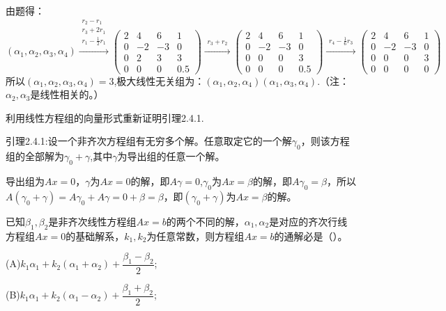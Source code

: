 \documentclass[a4paper]{report}
\begin{document}
\begin{jie}
由题得：
\begin{equation*}
(\alpha_1,\alpha_2,\alpha_3,\alpha_4)
\xrightarrow{\substack{r_{2}-r_{1}\\ r_3+2r_1\\ r_1-\frac{1}{2}r_1}}
{
\begin{pmatrix}
2&4&6&1\\
0&-2&-3&0\\
0&2&3&3\\
0&0&0&0.5
\end{pmatrix}
}\xrightarrow{\substack{r_3+r_2}}
{
\begin{pmatrix}
2&4&6&1\\
0&-2&-3&0\\
0&0&0&3\\
0&0&0&0.5
\end{pmatrix}
}\xrightarrow{\substack{r_4-\frac{1}{6}r_3}}
{
\begin{pmatrix}
2&4&6&1\\
0&-2&-3&0\\
0&0&0&3\\
0&0&0&0
\end{pmatrix}
}
\end{equation*}
所以$(\alpha_1,\alpha_2,\alpha_3,\alpha_4)=3$,极大线性无关组为：$(\alpha_1,\alpha_2,\alpha_4)(\alpha_1,\alpha_3,\alpha_4)$.（注：$\alpha_2,\alpha_3$是线性相关的。）
\end{jie}

\EX 利用线性方程组的向量形式重新证明引理2.4.1.

引理2.4.1:设一个非齐次方程组有无穷多个解。任意取定它的一个解$\gamma_0$，则该方程组的全部解为$\gamma_0+\gamma$,其中$\gamma$为导出组的任意一个解。

\begin{zhengming}
导出组为$Ax=0$，$\gamma$为$Ax=0$的解，即$A\gamma=0$,$\gamma_0$为$Ax=\beta$的解，即$A\gamma_0=\beta$，所以$A(\gamma_0+\gamma)=A\gamma_0+A\gamma=0+\beta=\beta$，即$(\gamma_0+\gamma)$为$Ax=\beta$的解。
\end{zhengming}

\EX 已知$\beta_1,\beta_2$是非齐次线性方程组$Ax=b$的两个不同的解，$\alpha_1,\alpha_2$是对应的齐次行线方程组$Ax=0$的基础解系，$k_1,k_2$为任意常数，则方程组$Ax=b$的通解必是（\hphantom{~~~~~~~~~~~~~}）。

(A)$k_1\alpha_1+k_2(\alpha_1+\alpha_2)+\dfrac{\beta_1-\beta_2}{2}$;

(B)$k_1\alpha_1+k_2(\alpha_1-\alpha_2)+\dfrac{\beta_1+\beta_2}{2}$;
\end{document}
